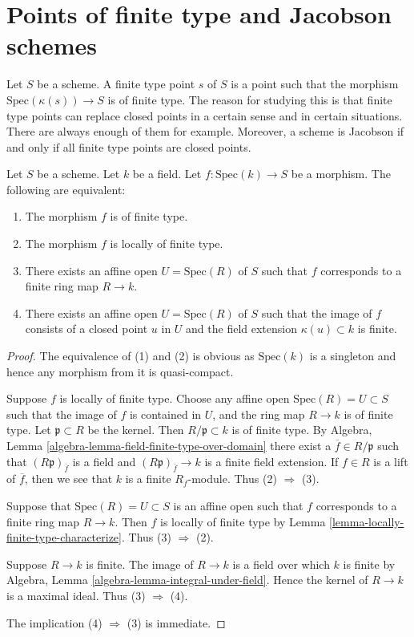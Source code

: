 \section{Points of finite type and Jacobson schemes}
\label{section-points-finite-type}

\noindent
Let $S$ be a scheme. A finite type point $s$ of $S$ is a point such
that the morphism $\text{Spec}(\kappa(s)) \to S$ is of finite type.
The reason for studying this is that finite type points can replace
closed points in a certain sense and in certain situations.
There are always enough of them for example. Moreover, a scheme
is Jacobson if and only if all finite type points are closed points.

\begin{lemma}
\label{lemma-point-finite-type}
Let $S$ be a scheme. Let $k$ be a field.
Let $f : \text{Spec}(k) \to S$ be a morphism.
The following are equivalent:
\begin{enumerate}
\item The morphism $f$ is of finite type.
\item The morphism $f$ is locally of finite type.
\item There exists an affine open $U = \text{Spec}(R)$ of $S$
such that $f$ corresponds to a finite ring map $R \to k$.
\item There exists an affine open $U = \text{Spec}(R)$ of $S$
such that the image of $f$ consists of a closed point $u$ in $U$
and the field extension $\kappa(u) \subset k$ is finite.
\end{enumerate}
\end{lemma}

\begin{proof}
The equivalence of (1) and (2) is obvious as $\text{Spec}(k)$
is a singleton and hence any morphism from it is quasi-compact.

\medskip\noindent
Suppose $f$ is locally of finite type. Choose any affine open
$\text{Spec}(R) = U \subset S$ such that the image of $f$
is contained in $U$, and the ring map $R \to k$
is of finite type. Let $\mathfrak p \subset R$ be the kernel.
Then $R/\mathfrak p \subset k$ is of finite type. By
Algebra, Lemma \ref{algebra-lemma-field-finite-type-over-domain}
there exist a $\overline{f} \in R/\mathfrak p$ such that
$(R\mathfrak p)_{\overline{f}}$ is a field and
$(R\mathfrak p)_{\overline{f}} \to k$ is a finite field
extension. If $f \in R$ is a lift of $\overline{f}$, then
we see that $k$ is a finite $R_f$-module. Thus (2) $\Rightarrow$ (3).

\medskip\noindent
Suppose that $\text{Spec}(R) = U \subset S$ is an affine open
such that $f$ corresponds to a finite ring map $R \to k$.
Then $f$ is locally of finite type
by Lemma \ref{lemma-locally-finite-type-characterize}.
Thus (3) $\Rightarrow$ (2).

\medskip\noindent
Suppose $R \to k$ is finite. The image of $R \to k$ is a field
over which $k$ is finite by
Algebra, Lemma \ref{algebra-lemma-integral-under-field}.
Hence the kernel of $R \to k$ is a maximal ideal.
Thus (3) $\Rightarrow$ (4).

\medskip\noindent
The implication (4) $\Rightarrow$ (3) is immediate.
\end{proof}

